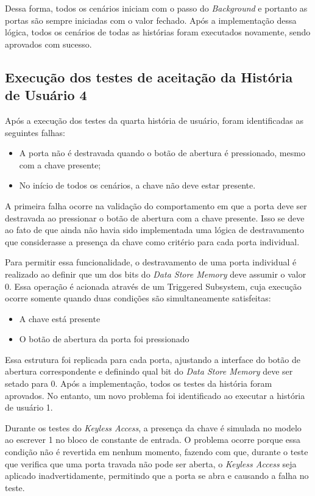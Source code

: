 Dessa forma, todos os cenários iniciam com o passo do \textit{Background} e portanto as portas são sempre iniciadas com o valor fechado. Após a implementação dessa 
lógica, todos os cenários de todas as histórias foram executados novamente, sendo aprovados com sucesso.


\subsection{Execução dos testes de aceitação da História de Usuário 4}

Após a execução dos testes da quarta história de usuário, foram identificadas as seguintes falhas:

\begin{itemize}
	\item A porta não é destravada quando o botão de abertura é pressionado, mesmo com a chave presente;
	\item No início de todos os cenários, a chave não deve estar presente.
\end{itemize}

A primeira falha ocorre na validação do comportamento em que a porta deve ser destravada ao pressionar o botão de abertura com a chave presente. Isso se deve ao fato 
de que ainda não havia sido implementada uma lógica de destravamento que considerasse a presença da chave como critério para cada porta individual.

Para permitir essa funcionalidade, o destravamento de uma porta individual é realizado ao definir que um dos bits do \textit{Data Store Memory} deve assumir o valor 0. 
Essa operação é acionada através de um Triggered Subsystem, cuja execução ocorre somente quando duas condições são simultaneamente satisfeitas:

\begin{itemize}
	\item A chave está presente
	\item O botão de abertura da porta foi pressionado
\end{itemize}

Essa estrutura foi replicada para cada porta, ajustando a interface do botão de abertura correspondente e definindo qual bit do \textit{Data Store Memory} deve ser setado 
para 0. Após a implementação, todos os testes da história foram aprovados. No entanto, um novo problema foi identificado ao executar a história de usuário 1.

Durante os testes do \textit{Keyless Access}, a presença da chave é simulada no modelo ao escrever 1 no bloco de constante de entrada. O problema ocorre porque essa 
condição não é revertida em nenhum momento, fazendo com que, durante o teste que verifica que uma porta travada não pode ser aberta, o \textit{Keyless Access} seja 
aplicado inadvertidamente, permitindo que a porta se abra e causando a falha no teste.

